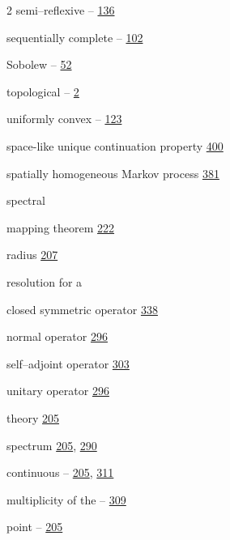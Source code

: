 \begin{multicols}{2}
\hspace*{1.1em}semi--reflexive -- \hyperlink{page.136}{136}\par
\hspace*{1.1em}sequentially complete -- \hyperlink{page.102}{102}\par
\hspace*{1.1em}Sobolew -- \hyperlink{page.52}{52}\par
\hspace*{1.1em}topological -- \hyperlink{page.2}{2}\par
\hspace*{1.1em}uniformly convex -- \hyperlink{page.123}{123}\par
\noindent space-like unique continuation property \hyperlink{page.400}{400}\par
\noindent spatially homogeneous Markov process \hyperlink{page.381}{381}\par
\noindent spectral\par
\hspace*{1.1em}mapping theorem \hyperlink{page.222}{222}\par
\hspace*{1.1em}radius \hyperlink{page.207}{207}\par
\hspace*{1.1em}resolution for a\par
\hspace*{2.2em}closed symmetric operator \hyperlink{page.338}{338}\par
\hspace*{2.2em}normal operator \hyperlink{page.296}{296}\par
\hspace*{2.2em}self--adjoint operator \hyperlink{page.303}{303}\par
\hspace*{2.2em}unitary operator \hyperlink{page.296}{296}\par
\hspace*{1.1em}theory \hyperlink{page.205}{205}\par
\noindent spectrum \hyperlink{page.205}{205}, \hyperlink{page.290}{290}\par
\hspace*{1.1em}continuous -- \hyperlink{page.205}{205}, \hyperlink{page.311}{311}\par
\hspace*{1.1em}multiplicity of the -- \hyperlink{page.309}{309}\par
\hspace*{1.1em}point -- \hyperlink{page.205}{205}\par

\end{multicols}
